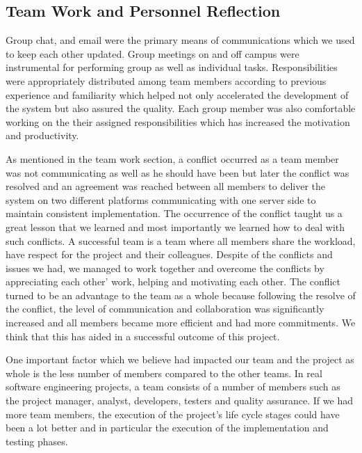 \documentclass{article}
\begin{document}
\subsection{Team Work and Personnel Reflection}
Group chat, and email were the primary means of communications which we used to keep each other updated. Group meetings on and off campus were instrumental for performing group as well as individual tasks. Responsibilities were appropriately distributed among team members according to previous experience and familiarity which helped not only accelerated the development of the system but also assured the quality. Each group member was also comfortable working on the their assigned responsibilities which has increased the motivation and productivity. \par

As mentioned in the team work section, a conflict occurred as a team member was not communicating as well as he should have been but later the conflict was resolved and an agreement was reached between all members to deliver the system on two different platforms communicating with one server side to maintain consistent implementation. The occurrence of the conflict taught us a great lesson that we learned and most importantly we learned how to deal with such conflicts. A successful team is a team where all members share the workload, have respect for the project and their colleagues. Despite of the conflicts and issues we had, we managed to work together and overcome the conflicts by appreciating each other' work, helping and motivating each other. The conflict turned to be an advantage to the team as a whole because following the resolve of the conflict, the level of communication and collaboration was significantly increased and all members became more efficient and had more commitments. We think that this has aided in a successful outcome of this project. \par

One important factor which we believe had impacted our team and the project as whole is the less number of members compared to the other teams. In real software engineering projects, a team consists of a number of members such as the project manager, analyst, developers, testers and quality assurance. If we had more team members, the execution of the project's life cycle stages could have been a lot better and in particular the execution of the implementation and testing phases. 
\end{document}
